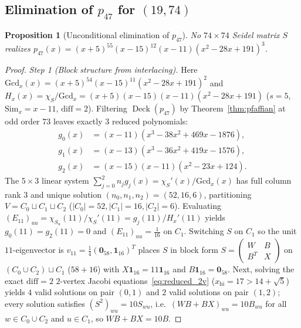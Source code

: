 \documentclass[11pt,reqno]{amsart}
\newtheorem{proposition}[theorem]{Proposition}
\theoremstyle{definition}
\theoremstyle{remark}
\numberwithin{equation}{section}
\numberwithin{table}{section}
\DeclareMathOperator{\Deck}{Deck}
\begin{document}
\subsection{Elimination of \texorpdfstring{$p_{47}$}{p\_47} for \texorpdfstring{$(19, 74)$}{(19, 74)}}
\begin{proposition}[Unconditional elimination of $p_{47}$]\label{prop:kill47}
No $74 \times 74$ Seidel matrix $S$ realizes $p_{47}(x) = (x + 5)^{55}(x - 15)^{12}(x - 11)(x^2 - 28x + 191)^3$.
\end{proposition}

\begin{proof}
\emph{Step 1 (Block structure from interlacing).}
Here $\mathrm{Gcd}_x(x) = (x+5)^{54}(x-15)^{11}(x^2-28x+191)^2$ and $H_x(x) = \chi_S / \mathrm{Gcd}_x = (x+5)(x-15)(x-11)(x^2-28x+191)$ ($s = 5$, $\mathrm{Sim}_x = x - 11$, $\mathrm{diff} = 2$). Filtering $\Deck(p_{47})$ by Theorem~\ref{thm:pfaffian} at odd order $73$ leaves exactly $3$ reduced polynomials:
\begin{align*}
  g_0(x) &= (x - 11)(x^3 - 38x^2 + 469x - 1876), \\
  g_1(x) &= (x - 13)(x^3 - 36x^2 + 419x - 1576), \\
  g_2(x) &= (x - 15)(x - 11)(x^2 - 23x + 124).
\end{align*}
The $5 \times 3$ linear system $\sum_{j=0}^2 n_j g_j(x) = \chi_S'(x)/\mathrm{Gcd}_x(x)$ has full column rank $3$ and unique solution $(n_0, n_1, n_2) = (52, 16, 6)$, partitioning $V = C_0 \sqcup C_1 \sqcup C_2$ ($|C_0|=52, |C_1|=16, |C_2|=6$). Evaluating $(E_{11})_{uu} = \chi_{S_u}(11)/\chi_S'(11) = g_j(11)/H_x'(11)$ yields $g_0(11) = g_2(11) = 0$ and $(E_{11})_{uu} = \frac{1}{16}$ on $C_1$. Switching $S$ on $C_1$ so the unit $11$-eigenvector is $v_{11} = \frac{1}{4}(\mathbf{0}_{58}, \mathbf{1}_{16})^T$ places $S$ in block form $S = \left(\begin{smallmatrix} W & B \\ B^T & X \end{smallmatrix}\right)$ on $(C_0 \cup C_2) \sqcup C_1$ ($58 + 16$) with $X\mathbf{1}_{16} = 11\mathbf{1}_{16}$ and $B\mathbf{1}_{16} = \mathbf{0}_{58}$. Next, solving the exact $\mathrm{diff}=2$ $2$-vertex Jacobi equations~\eqref{eq:reduced_2v} ($x_{\mathrm{hi}} = 17 > 14 + \sqrt{5}$) yields $4$ valid solutions on pair $(0, 1)$ and $2$ valid solutions on pair $(1, 2)$; every solution satisfies $(S^2)_{wu} = 10 S_{wu}$, i.e.\ $(WB + BX)_{wu} = 10 B_{wu}$ for all $w \in C_0 \cup C_2$ and $u \in C_1$, so $WB + BX = 10B$.


\end{proof}
\end{document}

